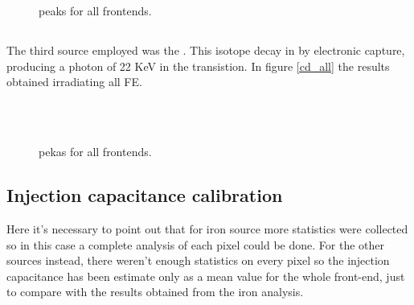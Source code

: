 \begin{figure}[h!]
\centering
{}\quad
{}\\
\quad
{}\\
\caption{ peaks for all frontends.}
\label{fig:am_all}
\end{figure}

\subsection{}

The third source employed was the . This isotope decay in  by electronic capture, producing a photon of 22 KeV in the transistion. In figure \vref{cd_all} the results obtained irradiating all FE. 

\begin{figure}[h!]
\centering
{}\quad
{}\\
\quad
{}\\
\caption{ pekas for all frontends.}
\label{fig:cd_all}
\end{figure}



\subsection{Injection capacitance calibration}

Here it's necessary to point out that for iron source more statistics were collected so in this case a complete analysis of each pixel could be done. For the other sources instead, there weren't enough statistics on every pixel so the injection capacitance has been estimate only as a mean value for the whole front-end, just to compare with the results obtained from the iron analysis.  

